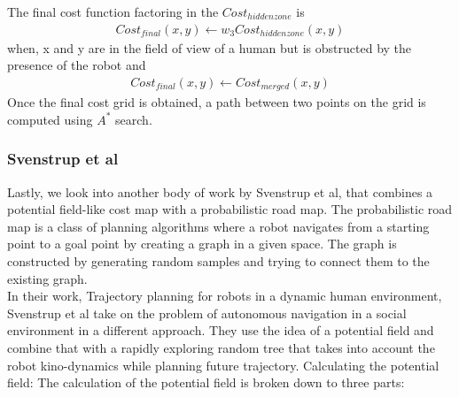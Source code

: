 The final cost function factoring in the $Cost_{hidden zone}$ is
\begin{align}
Cost_{final}(x,y) \leftarrow w_{3} Cost_{hidden zone}(x,y)
\end{align}
when, x and y are in the field of view of a human but is obstructed by the presence of the robot and 
\begin{align}
Cost_{final}(x,y) \leftarrow Cost_{merged}(x,y)
\end{align}
Once the final cost grid is obtained, a path between two points on the grid is computed using $A^*$ search.

\subsubsection*{Svenstrup et al}
Lastly, we look into another body of work by Svenstrup et al, that combines a potential field-like cost map with a probabilistic road map. The probabilistic road map is a class of planning algorithms where a robot navigates from a starting point to a goal point by creating a graph in a given space. The graph is constructed by generating random samples and trying to connect them to the existing graph.\\
In their work, Trajectory planning for robots in a dynamic human environment, Svenstrup et al take on the problem of autonomous navigation in a social environment in a different approach. They use the idea of a potential field and combine that with a rapidly exploring random tree that takes into account the robot kino-dynamics while planning future trajectory.
Calculating the potential field:
The calculation of the potential field is broken down to three parts:
